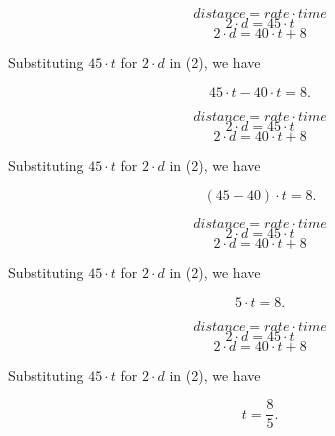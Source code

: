 \documentclass{beamer} %
\begin{document}
\begin{frame}
\[
distance = rate \cdot time
\]
\begin{equation}
2\cdot d = 45\cdot t
\end{equation}
\begin{equation}
2\cdot d = 40\cdot t + 8
\end{equation}

Substituting $45\cdot t$ for $2\cdot d$ in (2), we have

\[
45\cdot t - 40\cdot t = 8.
\]
\end{frame}

\setcounter{equation}{0}

\begin{frame}
\[
distance = rate \cdot time
\]
\begin{equation}
2\cdot d = 45\cdot t
\end{equation}
\begin{equation}
2\cdot d = 40\cdot t + 8
\end{equation}

Substituting $45\cdot t$ for $2\cdot d$ in (2), we have

\[
(45 - 40)\cdot t = 8.
\]
\end{frame}

\setcounter{equation}{0}

\begin{frame}
\[
distance = rate \cdot time
\]
\begin{equation}
2\cdot d = 45\cdot t
\end{equation}
\begin{equation}
2\cdot d = 40\cdot t + 8
\end{equation}

Substituting $45\cdot t$ for $2\cdot d$ in (2), we have

\[
5\cdot t = 8.
\]
\end{frame}

\setcounter{equation}{0}

\begin{frame}
\[
distance = rate \cdot time
\]
\begin{equation}
2\cdot d = 45\cdot t
\end{equation}
\begin{equation}
2\cdot d = 40\cdot t + 8
\end{equation}

Substituting $45\cdot t$ for $2\cdot d$ in (2), we have

\[
t = \frac{8}{5}.
\]
\end{frame}
\end{document}
